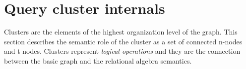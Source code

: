 \section{Query cluster internals}
\label{sec:cluster_internals}

Clusters are the elements of the highest organization level of the graph. This
section describes the semantic role of the cluster as a set of
connected n-nodes and t-nodes. Clusters represent \emph{logical operations} and they are the connection
between the basic graph and the relational algebra semantics.

